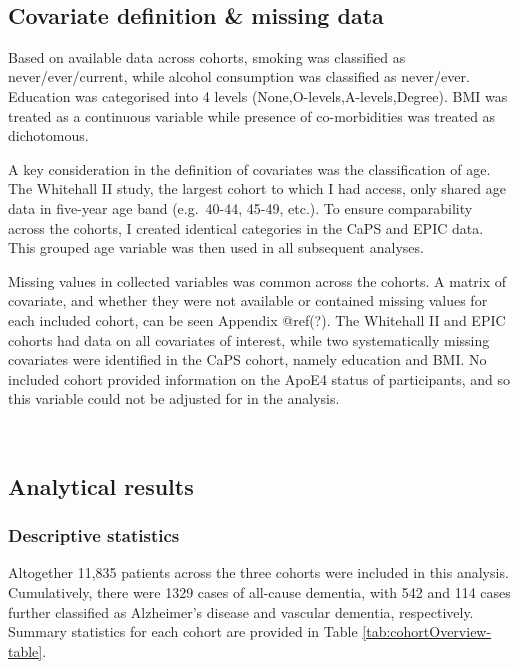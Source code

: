 \documentclass[a4paper, twoside]{templates/ociamthesis}
\begin{document}
~

\hypertarget{ipd-covar-definition}{%
\subsection{Covariate definition \& missing data}\label{ipd-covar-definition}}

Based on available data across cohorts, smoking was classified as never/ever/current, while alcohol consumption was classified as never/ever. Education was categorised into 4 levels (None,O-levels,A-levels,Degree). BMI was treated as a continuous variable while presence of co-morbidities was treated as dichotomous.

A key consideration in the definition of covariates was the classification of age. The Whitehall II study, the largest cohort to which I had access, only shared age data in five-year age band (e.g.~40-44, 45-49, etc.). To ensure comparability across the cohorts, I created identical categories in the CaPS and EPIC data. This grouped age variable was then used in all subsequent analyses.

Missing values in collected variables was common across the cohorts. A matrix of covariate, and whether they were not available or contained missing values for each included cohort, can be seen Appendix @ref(?). The Whitehall II and EPIC cohorts had data on all covariates of interest, while two systematically missing covariates were identified in the CaPS cohort, namely education and BMI. No included cohort provided information on the ApoE4 status of participants, and so this variable could not be adjusted for in the analysis.

~

\hypertarget{analytical-results}{%
\subsection{Analytical results}\label{analytical-results}}

\hypertarget{descriptive-statistics}{%
\subsubsection{Descriptive statistics}\label{descriptive-statistics}}

Altogether 11,835 patients across the three cohorts were included in this analysis. Cumulatively, there were 1329 cases of all-cause dementia, with 542 and 114 cases further classified as Alzheimer's disease and vascular dementia, respectively. Summary statistics for each cohort are provided in Table \ref{tab:cohortOverview-table}.
\end{document}
